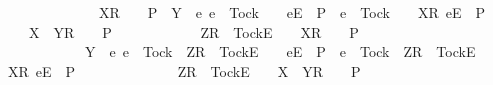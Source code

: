 \ \ \ \ \ \ \ \ \ \ \ {\isacharparenleft}{\isasymrho}\ {\isacharat}\ {\isacharbrackleft}X{\isacharbrackright}\isactrlsub R\ {\isacharhash}\ {\isasymsigma}\ {\isasymin}\ P\ {\isasymand}\ Y\ {\isasyminter}\ {\isacharbraceleft}e{\isachardot}\ e\ {\isasymnoteq}\ Tock\ {\isasymand}\ {\isasymrho}\ {\isacharat}\ {\isacharbrackleft}{\isacharbrackleft}e{\isacharbrackright}\isactrlsub E{\isacharbrackright}\ {\isasymin}\ P\ {\isasymor}\ e\ {\isacharequal}\ Tock\ {\isasymand}\ {\isasymrho}\ {\isacharat}\ {\isacharbrackleft}{\isacharbrackleft}X{\isacharbrackright}\isactrlsub R{\isacharcomma}\ {\isacharbrackleft}e{\isacharbrackright}\isactrlsub E{\isacharbrackright}\ {\isasymin}\ P{\isacharbraceright}\ {\isacharequal}\ {\isacharbraceleft}{\isacharbraceright}\ {\isasymLongrightarrow}\ {\isasymrho}\ {\isacharat}\ {\isacharbrackleft}X\ {\isasymunion}\ Y{\isacharbrackright}\isactrlsub R\ {\isacharhash}\ {\isasymsigma}\ {\isasymin}\ P{\isacharparenright}\ {\isasymLongrightarrow}\isanewline
\ \ \ \ \ \ \ \ \ \ \ {\isacharbrackleft}Z{\isacharbrackright}\isactrlsub R\ {\isacharhash}\ {\isacharbrackleft}Tock{\isacharbrackright}\isactrlsub E\ {\isacharhash}\ {\isasymrho}\ {\isacharat}\ {\isacharbrackleft}X{\isacharbrackright}\isactrlsub R\ {\isacharhash}\ {\isasymsigma}\ {\isasymin}\ P\ {\isasymand}\isanewline
\ \ \ \ \ \ \ \ \ \ \ Y\ {\isasyminter}\ {\isacharbraceleft}e{\isachardot}\ e\ {\isasymnoteq}\ Tock\ {\isasymand}\ {\isacharbrackleft}Z{\isacharbrackright}\isactrlsub R\ {\isacharhash}\ {\isacharbrackleft}Tock{\isacharbrackright}\isactrlsub E\ {\isacharhash}\ {\isasymrho}\ {\isacharat}\ {\isacharbrackleft}{\isacharbrackleft}e{\isacharbrackright}\isactrlsub E{\isacharbrackright}\ {\isasymin}\ P\ {\isasymor}\ e\ {\isacharequal}\ Tock\ {\isasymand}\ {\isacharbrackleft}Z{\isacharbrackright}\isactrlsub R\ {\isacharhash}\ {\isacharbrackleft}Tock{\isacharbrackright}\isactrlsub E\ {\isacharhash}\ {\isasymrho}\ {\isacharat}\ {\isacharbrackleft}{\isacharbrackleft}X{\isacharbrackright}\isactrlsub R{\isacharcomma}\ {\isacharbrackleft}e{\isacharbrackright}\isactrlsub E{\isacharbrackright}\ {\isasymin}\ P{\isacharbraceright}\ {\isacharequal}\ {\isacharbraceleft}{\isacharbraceright}\ {\isasymLongrightarrow}\isanewline
\ \ \ \ \ \ \ \ \ \ \ {\isacharbrackleft}Z{\isacharbrackright}\isactrlsub R\ {\isacharhash}\ {\isacharbrackleft}Tock{\isacharbrackright}\isactrlsub E\ {\isacharhash}\ {\isasymrho}\ {\isacharat}\ {\isacharbrackleft}X\ {\isasymunion}\ Y{\isacharbrackright}\isactrlsub R\ {\isacharhash}\ {\isasymsigma}\ {\isasymin}\ P{\isacharparenright}\ {\isasymLongrightarrow}\isanewline
